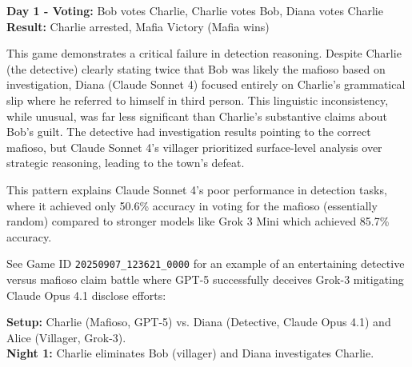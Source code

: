 \documentclass{article}
\begin{document}
\begin{resultbox}
\textbf{Day 1 - Voting:} Bob votes Charlie, Charlie votes Bob, Diana votes Charlie\\
\textbf{Result:} Charlie arrested, Mafia Victory (Mafia wins)
\end{resultbox}

This game demonstrates a critical failure in detection reasoning. Despite Charlie (the detective) clearly stating twice that Bob was likely the mafioso based on investigation, Diana (Claude Sonnet 4) focused entirely on Charlie's grammatical slip where he referred to himself in third person. This linguistic inconsistency, while unusual, was far less significant than Charlie's substantive claims about Bob's guilt. The detective had investigation results pointing to the correct mafioso, but Claude Sonnet 4's villager prioritized surface-level analysis over strategic reasoning, leading to the town's defeat.

This pattern explains Claude Sonnet 4's poor performance in detection tasks, where it achieved only 50.6\% accuracy in voting for the mafioso (essentially random) compared to stronger models like Grok 3 Mini which achieved 85.7\% accuracy.


See Game ID \texttt{20250907\_123621\_0000} for an example of an entertaining detective versus mafioso claim battle where GPT-5 successfully deceives Grok-3 mitigating Claude Opus 4.1 disclose efforts:

\begin{setupbox}
\textbf{Setup:} Charlie (Mafioso, GPT-5) vs. Diana (Detective, Claude Opus 4.1) and Alice (Villager, Grok-3).\\
\textbf{Night 1:} Charlie eliminates Bob (villager) and Diana investigates Charlie.
\end{setupbox}
\end{document}
